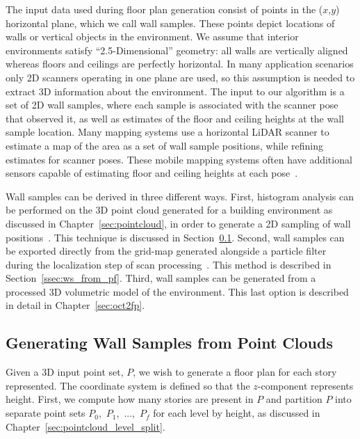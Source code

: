 \documentclass[12pt,onecolumn,oneside]{book}
\begin{document}
The input data used during floor plan generation consist of points in the ($x$,$y$) horizontal plane, which we call wall samples.  These points depict locations of walls or vertical objects in the environment.  We assume that interior environments satisfy ``2.5-Dimensional'' geometry:  all walls are vertically aligned whereas floors and ceilings are perfectly horizontal.  In many application scenarios only 2D scanners operating in one plane are used, so this assumption is needed to extract 3D information about the environment.  The input to our algorithm is a set of 2D wall samples, where each sample is associated with the scanner pose that observed it, as well as estimates of the floor and ceiling heights at the wall sample location.  Many mapping systems use a horizontal LiDAR scanner to estimate a map of the area as a set of wall sample positions, while refining estimates for scanner poses.  These mobile mapping systems often have additional sensors capable of estimating floor and ceiling heights at each pose~\cite{Backpack,Quadrotor}.  

Wall samples can be derived in three different ways.  First, histogram analysis can be performed on the 3D point cloud generated for a building environment as discussed in Chapter~\ref{sec:pointcloud}, in order to generate a 2D sampling of wall positions~\cite{Turner12}.  This technique is discussed in Section~\ref{ssec:ws_from_pc}.  Second, wall samples can be exported directly from the grid-map generated alongside a particle filter during the localization step of scan processing~\cite{NickJournal,Turner14}.  This method is described in Section~\ref{ssec:ws_from_pf}.  Third, wall samples can be generated from a processed 3D volumetric model of the environment.  This last option is described in detail in Chapter~\ref{sec:oct2fp}.

\subsection{Generating Wall Samples from Point Clouds}
\label{ssec:ws_from_pc}

Given a 3D input point set, $P$, we wish to generate a floor plan for each story represented.  The coordinate system is defined so that the $z$-component represents height.  First, we compute how many stories are present in $P$ and partition $P$ into separate point sets $P_0$,~$P_1$,~...,~$P_f$ for each level by height, as discussed in Chapter~\ref{sec:pointcloud_level_split}.
\end{document}
